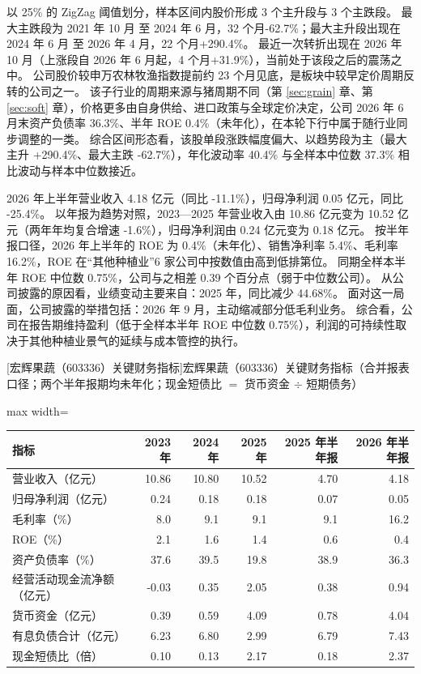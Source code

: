  以 25\% 的 ZigZag 阈值划分，样本区间内股价形成 3 个主升段与 3 个主跌段。 最大主跌段为 2021 年 10 月 至 2024 年 6 月，32 个月-62.7\%；最大主升段出现在 2024 年 6 月 至 2026 年 4 月，22 个月+290.4\%。 最近一次转折出现在 2026 年 10 月（上涨段自 2026 年 6 月起，4 个月+31.9\%），当前处于该段之后的震荡之中。 公司股价较申万农林牧渔指数提前约 23 个月见底，是板块中较早定价周期反转的公司之一。 该子行业的周期来源与猪周期不同（第 \ref{sec:grain} 章、第 \ref{sec:soft} 章），价格更多由自身供给、进口政策与全球定价决定，公司 2026 年 6 月末资产负债率 36.3\%、半年 ROE 0.4\%（未年化），在本轮下行中属于随行业同步调整的一类。 综合区间形态看，该股单段涨跌幅度偏大、以趋势段为主（最大主升 +290.4\%、最大主跌 -62.7\%），年化波动率 40.4\% 与全样本中位数 37.3\% 相比波动与样本中位数接近。

 2026 年上半年营业收入 4.18 亿元（同比 -11.1\%），归母净利润 0.05 亿元，同比 -25.4\%。 以年报为趋势对照，2023---2025 年营业收入由 10.86 亿元变为 10.52 亿元（两年年均复合增速 -1.6\%），归母净利润由 0.24 亿元变为 0.18 亿元。 按半年报口径，2026 年上半年的 ROE 为 0.4\%（未年化）、销售净利率 5.4\%、毛利率 16.2\%，ROE 在“其他种植业”6 家公司中按数值由高到低排第位。 同期全样本半年 ROE 中位数 0.75\%，公司与之相差 0.39 个百分点（弱于中位数公司）。 从公司披露的原因看，业绩变动主要来自：2025 年，同比减少 44.68\%。 面对这一局面，公司披露的举措包括：2026 年 9 月，主动缩减部分低毛利业务。 综合看，公司在报告期维持盈利（低于全样本半年 ROE 中位数 0.75\%），利润的可持续性取决于其他种植业景气的延续与成本管控的执行。

\begin{center}\small\setlength{\tabcolsep}{3.4pt}
[宏辉果蔬（603336）关键财务指标]{宏辉果蔬（603336）关键财务指标（合并报表口径；两个半年报期均未年化；现金短债比 $=$ 货币资金 $\div$ 短期债务）}
\begin{adjustbox}{max width=\textwidth}
\begin{tabular}{@{}lrrrrr@{}}
\toprule
指标 & 2023 年 & 2024 年 & 2025 年 & 2025 年半年报 & 2026 年半年报 \\
\midrule
营业收入（亿元） & 10.86 & 10.80 & 10.52 & 4.70 & 4.18 \\
归母净利润（亿元） & 0.24 & 0.18 & 0.18 & 0.07 & 0.05 \\
毛利率（\%） & 8.0 & 9.1 & 9.1 & 9.1 & 16.2 \\
ROE（\%） & 2.1 & 1.6 & 1.4 & 0.6 & 0.4 \\
资产负债率（\%） & 37.6 & 39.5 & 19.8 & 38.9 & 36.3 \\
经营活动现金流净额（亿元） & -0.03 & 0.35 & 2.05 & 0.38 & 0.94 \\
货币资金（亿元） & 0.39 & 0.59 & 4.09 & 0.78 & 4.04 \\
有息负债合计（亿元） & 6.23 & 6.80 & 2.99 & 6.79 & 7.43 \\
现金短债比（倍） & 0.10 & 0.13 & 2.17 & 0.18 & 2.37 \\
\bottomrule
\end{tabular}
\end{adjustbox}
\end{center}

